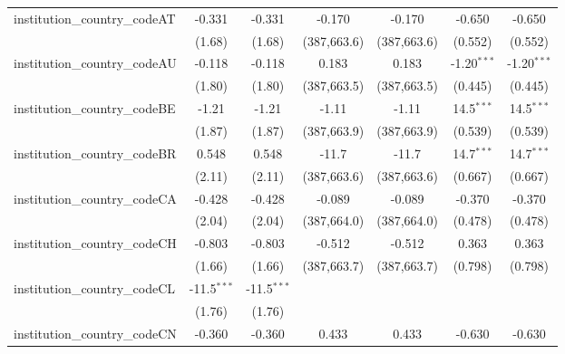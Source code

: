 \begin{tabular}{lcccccc}
   institution\_country\_codeAT          & -0.331        & -0.331        & -0.170        & -0.170        & -0.650        & -0.650\\   
                                         & (1.68)        & (1.68)        & (387,663.6)   & (387,663.6)   & (0.552)       & (0.552)\\   
   institution\_country\_codeAU          & -0.118        & -0.118        & 0.183         & 0.183         & -1.20$^{***}$ & -1.20$^{***}$\\   
                                         & (1.80)        & (1.80)        & (387,663.5)   & (387,663.5)   & (0.445)       & (0.445)\\   
   institution\_country\_codeBE          & -1.21         & -1.21         & -1.11         & -1.11         & 14.5$^{***}$  & 14.5$^{***}$\\   
                                         & (1.87)        & (1.87)        & (387,663.9)   & (387,663.9)   & (0.539)       & (0.539)\\   
   institution\_country\_codeBR          & 0.548         & 0.548         & -11.7         & -11.7         & 14.7$^{***}$  & 14.7$^{***}$\\   
                                         & (2.11)        & (2.11)        & (387,663.6)   & (387,663.6)   & (0.667)       & (0.667)\\   
   institution\_country\_codeCA          & -0.428        & -0.428        & -0.089        & -0.089        & -0.370        & -0.370\\   
                                         & (2.04)        & (2.04)        & (387,664.0)   & (387,664.0)   & (0.478)       & (0.478)\\   
   institution\_country\_codeCH          & -0.803        & -0.803        & -0.512        & -0.512        & 0.363         & 0.363\\   
                                         & (1.66)        & (1.66)        & (387,663.7)   & (387,663.7)   & (0.798)       & (0.798)\\   
   institution\_country\_codeCL          & -11.5$^{***}$ & -11.5$^{***}$ &               &               &               &   \\   
                                         & (1.76)        & (1.76)        &               &               &               &   \\   
   institution\_country\_codeCN          & -0.360        & -0.360        & 0.433         & 0.433         & -0.630        & -0.630\\   

\end{tabular}
